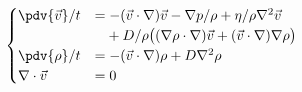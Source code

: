 \begin{equation}\label{eq:vdinse_sys}
\begin{cases}
  \pdv{\vec{v}}/{t} &=
      - (\vec{v} \cdot \nabla)\vec{v}
      - \nabla{p} / \rho
      + \eta/\rho \nabla^2\vec{v}
      \\
      &\phantom{=}
      + D/\rho \big(
            (\nabla{\rho} \cdot \nabla)\vec{v}
          + (\vec{v} \cdot \nabla)\nabla\rho
        \big)
  \\
  \pdv{\rho}/{t} &=
    - (\vec{v} \cdot \nabla)\rho
    + D \nabla^2 \rho
  \\
  \nabla \cdot \vec{v} &= 0
\end{cases}
\end{equation}
